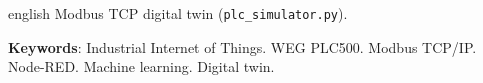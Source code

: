 \begin{resumo}[Abstract]
\begin{otherlanguage*}{english}
Modbus TCP digital twin (\texttt{plc\_\allowbreak simulator.py}).

\vspace{\onelineskip}
\noindent
\textbf{Keywords}: Industrial Internet of Things. WEG PLC500. Modbus TCP/IP. Node-RED. Machine learning. Digital twin.
\end{otherlanguage*}
\end{resumo}
